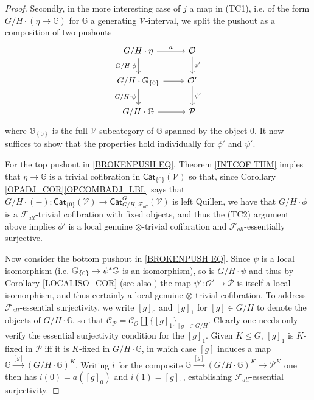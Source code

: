 \documentclass[a4paper,10pt
,draft
]{article}%
\numberwithin{equation}{section}
\numberwithin{figure}{section}
\theoremstyle{definition} %
\newcommand{\set}[1]{\left\{#1\right\}}%
\newcommand{\F}{\ensuremath{\mathcal F}}
\newcommand{\V}{\ensuremath{\mathcal V}}
\renewcommand{\O}{\ensuremath{\mathcal O}}
\renewcommand{\P}{\ensuremath{\mathcal P}}
\newcommand{\C}{\ensuremath{\mathcal C}}
\newcommand{\1}{\ensuremath{\mathbbm 1}}%
\begin{document}
\begin{proof}
     
	Secondly, in the more interesting case of $j$ a map in (TC1), 
	i.e. of the form $G/H \cdot (\eta \to \mathbb{G})$ for $\mathbb{G}$ a generating $\V$-interval,
	we split the pushout as a composition of two pushouts 
\begin{equation}\label{BROKENPUSH EQ}
\begin{tikzcd}
	G/H \cdot \eta \arrow[r, "a"] \arrow[d, "G/H \cdot \phi"']
&
	\O \arrow[d,"\phi'"]
\\
	G/H \cdot \mathbb{G}_{\set{0}} \arrow[r] \arrow[d, "G/H \cdot \psi"']
&
	\O' \arrow[d,"\psi'"]
\\
	G/H \cdot \mathbb{G} \arrow[r]
&
	\P
\end{tikzcd}
\end{equation}
      where $\mathbb{G}_{\set{0}}$ is the full $\V$-subcategory of $\mathbb{G}$ spanned by the object $0$.
      It now suffices to show that the properties hold individually for $\phi'$ and $\psi'$.
 
      
      For the top pushout in \eqref{BROKENPUSH EQ}, Theorem \ref{INTCOF THM} imples that $\eta \to \mathbb{G}$
      is a trivial cofibration in $\mathsf{Cat}_{\{0\}}(\V)$
      so that, since Corollary \ref{OPADJ_COR}\ref{OPCOMBADJ_LBL} %
      says that $G/H \cdot (-) \colon \mathsf{Cat}_{\{0\}}(\V) \to \mathsf{Cat}^G_{G/H,\F_{all}}(\V)$ is left Quillen,
      we have that $G/H \cdot \phi$ is a $\F_{all}$-trivial cofibration with fixed objects,
      and thus the (TC2) argument above implies $\phi'$ is
      a local genuine $\otimes$-trivial cofibration and
      $\F_{all}$-essentially surjective.
      
	Now consider the bottom pushout in \eqref{BROKENPUSH EQ}.
	Since $\psi$ is a local isomorphism (i.e. $\mathbb{G}_{\{0\}} \to \psi^{\**}\mathbb{G}$ is an isomorphism),
	so is $G/H \cdot \psi$ and thus by Corollary \ref{LOCALISO_COR} (see also \cite[Prop. B.22]{Cav})
	the map $\psi' \colon \O' \to \mathcal{P}$
	is itself a local isomorphism, and thus certainly a local genuine $\otimes$-trivial cofibration.
% 
	To address $\F_{all}$-essential surjectivity, 
	we write $[g]_0$ and $[g]_1$ for $[g] \in G/H$
	to denote the objects of $G/H \cdot \mathbb{G}$,
	so that $\C_{\P} = \C_{\O} \amalg \{[g]_1\}_{[g] \in G/H}$.
	Clearly one needs only verify the essential surjectivity condition for the $[g]_1$.
	Given $K \leq G$,
	$[g]_1$ is $K$-fixed in $\P$ iff it is $K$-fixed in $G/H \cdot \mathbb{G}$,
	in which case $[g]$ induces a map
	$\mathbb{G} \xrightarrow{[g]} \left(G/H \cdot \mathbb{G}\right)^K$.
	Writing $i$ for the composite 
	$\mathbb{G} \xrightarrow{[g]} \left(G/H \cdot \mathbb{G}\right)^K \to \P^K$
	one then has $i(0) = a([g]_0)$ and $i(1)=[g]_1$,
	establishing $\F_{all}$-essential surjectivity.
\end{proof}
\end{document}
